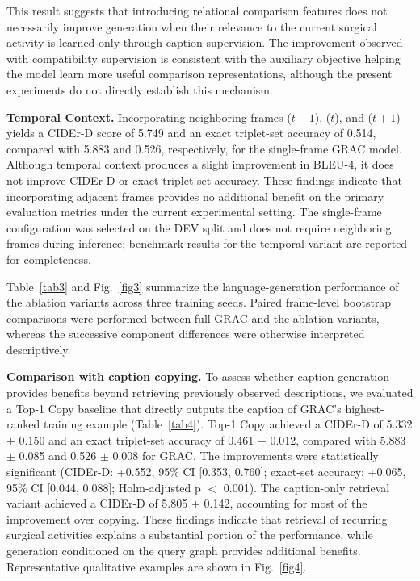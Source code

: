 \documentclass[11pt]{article}
\begin{document}
This result suggests that introducing relational comparison features does not necessarily improve generation when their relevance to the current surgical activity is learned only through caption supervision. The improvement observed with compatibility supervision is consistent with the auxiliary objective helping the model learn more useful comparison representations, although the present experiments do not directly establish this mechanism.

\textbf{Temporal Context.} Incorporating neighboring frames ($t-1$), ($t$), and ($t+1$) yields a CIDEr-D score of 5.749 and an exact triplet-set accuracy of 0.514, compared with 5.883 and 0.526, respectively, for the single-frame GRAC model. Although temporal context produces a slight improvement in BLEU-4, it does not improve CIDEr-D or exact triplet-set accuracy. These findings indicate that incorporating adjacent frames provides no additional benefit on the primary evaluation metrics under the current experimental setting. The single-frame configuration was selected on the DEV split and does not require neighboring frames during inference; benchmark results for the temporal variant are reported for completeness.

Table~\ref{tab3} and Fig.~\ref{fig3} summarize the language-generation performance of the ablation variants across three training seeds. Paired frame-level bootstrap comparisons were performed between full GRAC and the ablation variants, whereas the successive component differences were otherwise interpreted descriptively.

\textbf{Comparison with caption copying.} To assess whether caption generation provides benefits beyond retrieving previously observed descriptions, we evaluated a Top-1 Copy baseline that directly outputs the caption of GRAC's highest-ranked training example (Table~\ref{tab4}). Top-1 Copy achieved a CIDEr-D of 5.332 $\pm$ 0.150 and an exact triplet-set accuracy of 0.461 $\pm$ 0.012, compared with 5.883 $\pm$ 0.085 and 0.526 $\pm$ 0.008 for GRAC. The improvements were statistically significant (CIDEr-D: +0.552, 95\% CI [0.353, 0.760]; exact-set accuracy: +0.065, 95\% CI [0.044, 0.088]; Holm-adjusted p $<$ 0.001). The caption-only retrieval variant achieved a CIDEr-D of 5.805 $\pm$ 0.142, accounting for most of the improvement over copying. These findings indicate that retrieval of recurring surgical activities explains a substantial portion of the performance, while generation conditioned on the query graph provides additional benefits. Representative qualitative examples are shown in Fig.~\ref{fig4}.
\end{document}
